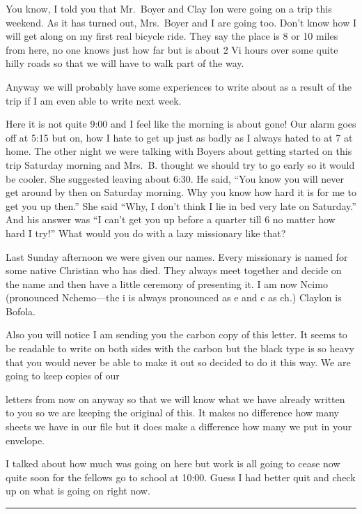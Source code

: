\documentclass[
]{book}
\begin{document}
You know, I told you that Mr.~Boyer and Clay Ion were going on a trip this weekend. As it has turned out, Mrs.~Boyer and I are going too. Don't know how I will get along on my first real bicycle ride. They say the place is 8 or 10 miles from here, no one knows just how far but is about 2 Vi hours over some quite hilly roads so that we will have to walk part of the way.

Anyway we will probably have some experiences to write about as a result of the trip if I am even able to write next week.

Here it is not quite 9:00 and I feel like the morning is about gone! Our alarm goes off at 5:15 but on, how I hate to get up just as badly as I always hated to at 7 at home. The other night we were talking with Boyers about getting started on this trip Saturday morning and Mrs.~B. thought we should try to go early so it would be cooler. She suggested leaving about 6:30. He said, ``You know you will never get around by then on Saturday morning. Why you know how hard it is for me to get you up then.'' She said ``Why, I don't think I lie in bed very late on Saturday.'' And his answer was ``I can't get you up before a quarter till 6 no matter how hard I try!'' What would you do with a lazy missionary like that?

Last Sunday afternoon we were given our names. Every missionary is named for some native Christian who has died. They always meet together and decide on the name and then have a little ceremony of presenting it. I am now Ncimo (pronounced Nchemo---the i is always pronounced as e and c as ch.) Claylon is Bofola.

Also you will notice I am sending you the carbon copy of this letter. It seems to be readable to write on both sides with the carbon but the black type is so heavy that you would never be able to make it out so decided to do it this way. We are going to keep copies of our

letters from now on anyway so that we will know what we have already written to you so we are keeping the original of this. It makes no difference how many sheets we have in our file but it does make a difference how many we put in your envelope.

I talked about how much was going on here but work is all going to cease now quite soon for the fellows go to school at 10:00. Guess I had better quit and check up on what is going on right now.

\begin{center}\rule{0.5\linewidth}{0.5pt}\end{center}
\end{document}
